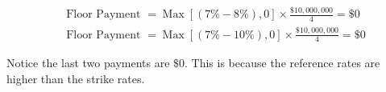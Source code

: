 \documentclass[11pt]{article}
\begin{document}
$$
\begin{aligned}
& \text { Floor Payment }=\operatorname{Max}[(7 \%-8 \%), 0] \times \frac{\$ 10,000,000}{4}=\$ 0 \\
& \text { Floor Payment }=\operatorname{Max}[(7 \%-10 \%), 0] \times \frac{\$ 10,000,000}{4}=\$ 0
\end{aligned}
$$

Notice the last two payments are $\$ 0$. This is because the reference rates are higher than the strike rates.
\end{document}
